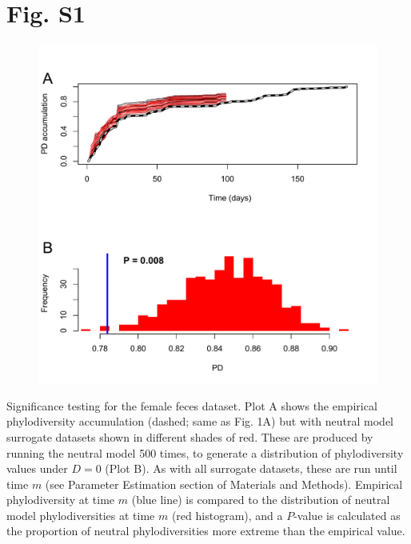 \documentclass{article}
\begin{document}
%
%
\section*{Fig. S1}
\begin{figure}[ht]
	\centering
	\includegraphics[scale=0.80]{../Fig_S1.pdf}
\end{figure}
Significance testing for the female feces dataset. Plot A shows the empirical phylodiversity accumulation (dashed; same as Fig. 1A) but with neutral model surrogate datasets shown in different shades of red. These are produced by running the neutral model 500 times, to generate a distribution of phylodiversity values under \(D = 0\) (Plot B). As with all surrogate datasets, these are run until time \(m\) (see Parameter Estimation section of Materials and Methods). Empirical phylodiversity at time \(m\) (blue line) is compared to the distribution of neutral model phylodiversities at time \(m\) (red histogram), and a \(P\)-value is calculated as the proportion of neutral phylodiversities more extreme than the empirical value. 
\newpage
%
%
\end{document}
